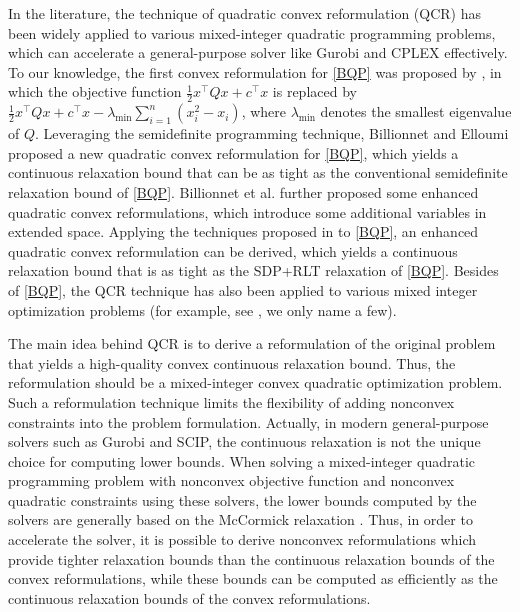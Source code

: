 \documentclass[pdflatex,sn-mathphys-num]{sn-jnl}%
\theoremstyle{thmstyleone}%
\theoremstyle{thmstyletwo}%
\theoremstyle{thmstylethree}%
\begin{document}
In the literature, the technique of quadratic convex reformulation (QCR) has been widely applied to various mixed-integer quadratic programming problems, which can accelerate a general-purpose solver like Gurobi and CPLEX effectively. To our knowledge, the first convex reformulation for \eqref{BQP} was proposed by \cite{Hammer}, in which the objective function $\frac{1}{2}x^\top Q x+ c^\top x$ is replaced by $\frac{1}{2}x^\top Q x+ c^\top x-\lambda_{\min} \sum_{i=1}^n (x_i^2-x_i)$, where $\lambda_{\min}$ denotes the smallest eigenvalue of $Q$. Leveraging the semidefinite programming technique, Billionnet and Elloumi \cite{Billionnet2007} proposed a new quadratic convex reformulation for \eqref{BQP}, which yields a continuous relaxation bound that can be as tight as the conventional semidefinite relaxation bound of \eqref{BQP}. Billionnet et al. \cite{Billionnet2012,Billionnet2013} further proposed some enhanced quadratic convex reformulations, which introduce some additional variables in extended space. Applying the techniques proposed in \cite{Billionnet2012,Billionnet2013} to \eqref{BQP}, an enhanced quadratic convex reformulation can be derived, which yields  a continuous relaxation bound that is as tight as the SDP+RLT relaxation \cite{Anstreicher}  of \eqref{BQP}. Besides of \eqref{BQP}, the QCR technique has also been applied to various mixed integer optimization problems (for example, see \cite{Billionnet2016,Billionnet2017,Elloumi,Lu2025,Plateau,Wu,Zheng2020,Zheng2014}, we only name a few).

The main idea behind QCR is to derive a reformulation of the original problem that yields a high-quality convex continuous relaxation bound. Thus, the reformulation should be a mixed-integer convex quadratic optimization problem. Such a reformulation technique limits the flexibility of adding nonconvex constraints into the problem formulation. Actually, in modern general-purpose solvers such as Gurobi and SCIP, the continuous relaxation is not the unique choice for computing lower bounds. When solving a mixed-integer quadratic programming problem with nonconvex objective function and nonconvex quadratic constraints using these solvers, the lower bounds computed by the solvers are generally based on the McCormick relaxation \cite{McCormick}. Thus, in order to accelerate the solver, it is possible to derive nonconvex reformulations which provide tighter relaxation bounds than the continuous relaxation bounds of the convex reformulations, while these bounds can be computed as efficiently as the continuous relaxation bounds of the convex reformulations.
\end{document}

